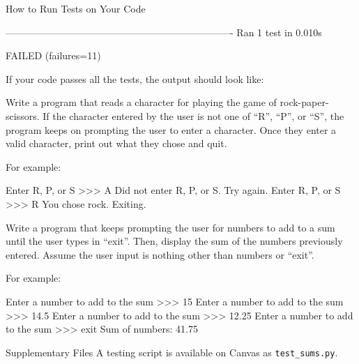 \documentclass[11pt]{cselabheader}
\begin{document}
{\begin{infobox}{How to Run Tests on Your Code}
\begin{bashcode}
----------------------------------------------------------------------
Ran 1 test in 0.010s

FAILED (failures=11)
\end{bashcode}

If your code passes all the tests, the output should look like:

\end{infobox}

\begin{ex}[rps.py] Write a program that reads a character for playing the game of
    rock-paper-scissors. If the character entered by the user is not one of
    ``R'', ``P'', or ``S'', the program keeps on prompting the user to enter a
    character. Once they enter a valid character, print out what they chose
    and quit.


    For example:

\begin{verbatimcode}
Enter R, P, or S >>> A
Did not enter R, P, or S. Try again.
Enter R, P, or S >>> R
You chose rock. Exiting.
\end{verbatimcode}
\end{ex}


\begin{ex}[sums.py] Write a program that keeps prompting the user for numbers to
  add to a sum until the user types in ``exit''. Then, display the sum of the
  numbers previously entered. Assume the user input is nothing other than
  numbers or ``exit''.

  For example:

  \begin{verbatimcode}
Enter a number to add to the sum >>> 15
Enter a number to add to the sum >>> 14.5
Enter a number to add to the sum >>> 12.25
Enter a number to add to the sum >>> exit
Sum of numbers: 41.75
  \end{verbatimcode}
\end{ex}
\begin{infobox}{Supplementary Files}
A testing script is available on Canvas as \texttt{test\_sums.py}.
\end{infobox}

}
\end{document}
